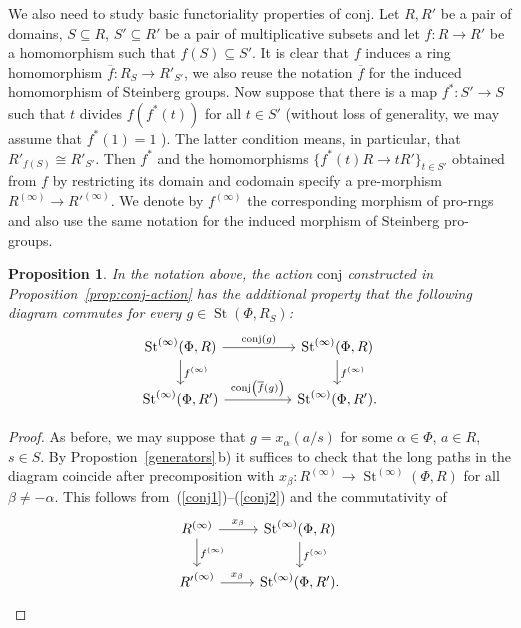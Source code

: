 \documentclass[oneside, 11pt]{amsart}
\numberwithin{equation}{section}
\newtheorem{proposition}[lemma]{Proposition}
\newcommand{\St}{\mathop{\mathrm{St}}\nolimits}
\theoremstyle{definition}
\theoremstyle{definition}
\theoremstyle{remark}
\begin{document}
We also need to study basic functoriality properties of $\mathrm{conj}$.
Let $R, R'$ be a pair of domains, $S \subseteq R$, $S' \subseteq R'$ be a pair of multiplicative subsets and let $f \colon R \to R'$ be a homomorphism such that $f(S)\subseteq S'$.
It is clear that $f$ induces a ring homomorphism $\overline{f}\colon R_S \to R'_{S'}$, we also reuse the notation $\overline{f}$ for the induced homomorphism of Steinberg groups.
Now suppose that there is a map $f^* \colon S' \to S$ such that $t$ divides $f(f^*(t))$ for all $t \in S'$ (without loss of generality, we may assume that $f^*(1)=1$ ). The latter condition means, in particular, that $R'_{f(S)} \cong R'_{S'}$. Then $f^*$ and the homomorphisms $\{f^*(t)R \to tR'\}_{t\in S'}$ obtained from $f$ by restricting its domain and codomain specify a pre-morphism $R^{(\infty)} \to R'^{(\infty)}$. We denote by $f^{(\infty)}$ the corresponding morphism of pro-rngs and also use the same notation for the induced morphism of Steinberg pro-groups.

\begin{proposition} \label{prop:functoriality}
In the notation above, the action $\mathrm{conj}$ constructed in Proposition~\ref{prop:conj-action} has the additional property that the following diagram commutes for every $g \in \St(\Phi, R_S)$:
 \begin{equation} \label{eq:conj-finfty} \begin{tikzcd} \St^{(\infty)}(\Phi, R) \ar{rr}{\mathrm{conj}(g)} \ar{d}{f^{(\infty)}} && \St^{(\infty)}(\Phi, R) \ar{d}{f^{(\infty)}} \\ \St^{(\infty)}(\Phi, R') \ar{rr}{\mathrm{conj}\big(\overline{f}(g)\big)} && \St^{(\infty)}(\Phi, R'). \end{tikzcd} \end{equation}
\end{proposition}
\begin{proof}
As before, we may suppose that \(g = x_\alpha(a/s)\) for some \(\alpha \in \Phi\), \(a \in R\), \(s \in S\). By Propostion~\ref{generators}\,b) 
it suffices to check that the long paths in the diagram coincide after precomposition with \(x_\beta \colon R^{(\infty)} \to \St^{(\infty)}(\Phi, R)\) for all \(\beta \neq -\alpha\). This follows from~(\ref{conj1})--(\ref{conj2}) and the commutativity of
\[\begin{tikzcd}
R^{(\infty)} \ar{r}{x_\beta} \ar{d}{f^{(\infty)}} &
\St^{(\infty)}(\Phi, R) \ar{d}{f^{(\infty)}} \\
{R'}^{(\infty)} \ar{r}{x_\beta} & \St^{(\infty)}(\Phi, R'). \end{tikzcd}\]
\end{proof}
\end{document}
